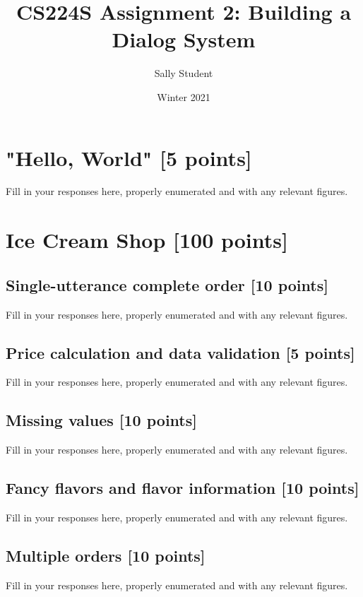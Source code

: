 \documentclass{article}
\title{CS224S Assignment 2: Building a Dialog System}
\author{Sally Student}
\date{Winter 2021}
\begin{document}
\maketitle

\section{"Hello, World" [5 points]}

Fill in your responses here, properly enumerated and with any relevant figures.

\section{Ice Cream Shop [100 points]}

	\subsection{Single-utterance complete order [10 points]}

	Fill in your responses here, properly enumerated and with any relevant figures.

	\subsection{Price calculation and data validation [5 points]}

	Fill in your responses here, properly enumerated and with any relevant figures.

	\subsection{Missing values [10 points]}

	Fill in your responses here, properly enumerated and with any relevant figures.

	\subsection{Fancy flavors and flavor information [10 points]}

	Fill in your responses here, properly enumerated and with any relevant figures.

	\subsection{Multiple orders [10 points]}

	Fill in your responses here, properly enumerated and with any relevant figures.
\end{document}
